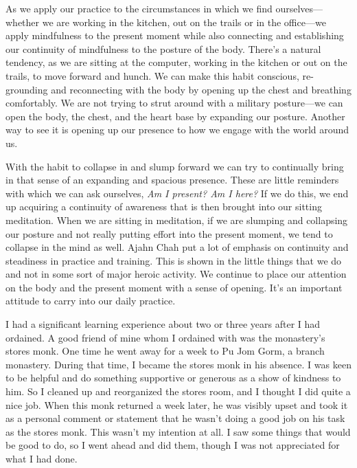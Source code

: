 
As we apply our practice to the circumstances in which we find 
ourselves---whether we are working in the kitchen, out on the trails or 
in the office---we apply mindfulness to the present moment while also 
connecting and establishing our continuity of mindfulness to the 
posture of the body. There's a natural tendency, as we are sitting at 
the computer, working in the kitchen or out on the trails, to move 
forward and hunch. We can make this habit conscious, re-grounding and 
reconnecting with the body by opening up the chest and breathing 
comfortably. We are not trying to strut around with a military 
posture---we can open the body, the chest, and the heart base by 
expanding our posture. Another way to see it is opening up our presence 
to how we engage with the world around us.

With the habit to collapse in and slump forward we can try to 
continually bring in that sense of an expanding and spacious presence. 
These are little reminders with which we can ask ourselves, \emph{Am I 
present? Am I here?} If we do this, we end up acquiring a continuity of 
awareness that is then brought into our sitting meditation. When we are 
sitting in meditation, if we are slumping and collapsing our posture 
and not really putting effort into the present moment, we tend to 
collapse in the mind as well. Ajahn Chah put a lot of emphasis on 
continuity and steadiness in practice and training. This is shown in 
the little things that we do and not in some sort of major heroic 
activity. We continue to place our attention on the body and the 
present moment with a sense of opening. It's an important attitude to 
carry into our daily practice.


I had a significant learning experience about two or three years after 
I had ordained. A good friend of mine whom I ordained with was the 
monastery's stores monk. One time he went away for a week to Pu Jom 
Gorm, a branch monastery. During that time, I became the stores monk in 
his absence. I was keen to be helpful and do something supportive or 
generous as a show of kindness to him. So I cleaned up and reorganized 
the stores room, and I thought I did quite a nice job. When this monk 
returned a week later, he was visibly upset and took it as a personal 
comment or statement that he wasn't doing a good job on his task as the 
stores monk. This wasn't my intention at all. I saw some things that 
would be good to do, so I went ahead and did them, though I was not 
appreciated for what I had done.

